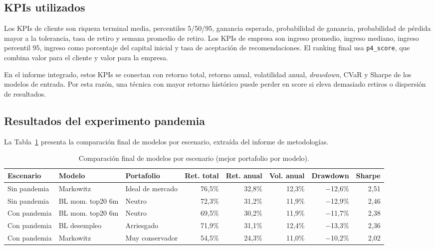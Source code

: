 \subsection*{KPIs utilizados}

Los KPIs de cliente son riqueza terminal media, percentiles 5/50/95, ganancia
esperada, probabilidad de ganancia, probabilidad de p\'erdida mayor a la
tolerancia, tasa de retiro y semana promedio de retiro. Los KPIs de empresa son
ingreso promedio, ingreso mediano, ingreso percentil 95, ingreso como porcentaje
del capital inicial y tasa de aceptaci\'on de recomendaciones. El ranking final
usa \texttt{p4\_score}, que combina valor para el cliente y valor para la
empresa.

En el informe integrado, estos KPIs se conectan con retorno total, retorno
anual, volatilidad anual, \textit{drawdown}, CVaR y Sharpe de los modelos de
entrada. Por esta raz\'on, una t\'ecnica con mayor retorno hist\'orico puede perder
en score si eleva demasiado retiros o dispersi\'on de resultados.

\subsection*{Resultados del experimento pandemia}

La Tabla~\ref{tab:anexo4_comparacion_modelos} presenta la comparaci\'on final de
modelos por escenario, extra\'ida del informe de metodolog\'ias.

\begin{table}[H]
\centering
\caption{Comparaci\'on final de modelos por escenario (mejor portafolio por modelo).}
\label{tab:anexo4_comparacion_modelos}
\small
\begin{adjustbox}{max width=\textwidth}
\begin{tabular}{@{}lllrrrrr@{}}
\toprule
Escenario & Modelo & Portafolio & Ret. total & Ret. anual & Vol. anual & Drawdown & Sharpe \\
\midrule
Sin pandemia & Markowitz & Ideal de mercado & 76,5\% & 32,8\% & 12,3\% & $-$12,6\% & 2,51 \\
Sin pandemia & BL mom. top20 6m & Neutro & 72,3\% & 31,2\% & 11,9\% & $-$12,9\% & 2,46 \\
\midrule
Con pandemia & BL mom. top20 6m & Neutro & 69,5\% & 30,2\% & 11,9\% & $-$11,7\% & 2,38 \\
Con pandemia & BL desempleo & Arriesgado & 71,9\% & 31,1\% & 12,4\% & $-$13,3\% & 2,36 \\
Con pandemia & Markowitz & Muy conservador & 54,5\% & 24,3\% & 11,0\% & $-$10,2\% & 2,02 \\
\bottomrule
\end{tabular}
\end{adjustbox}
\end{table}

